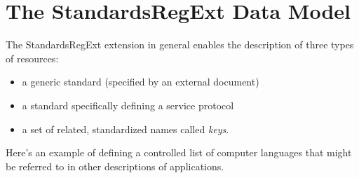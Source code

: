 \documentclass[11pt,a4paper]{ivoa}
\begin{document}
\section{The StandardsRegExt Data Model}

The StandardsRegExt extension in general enables the description of three
types of resources:

\begin{itemize}
\item  a generic standard (specified by an external document)
\item  a standard specifically defining a service protocol
\item  a set of related, standardized names called \emph{keys}.
\end{itemize}


Here's an example of defining a controlled list of computer languages
that might be referred to in other descriptions of applications.
\end{document}
